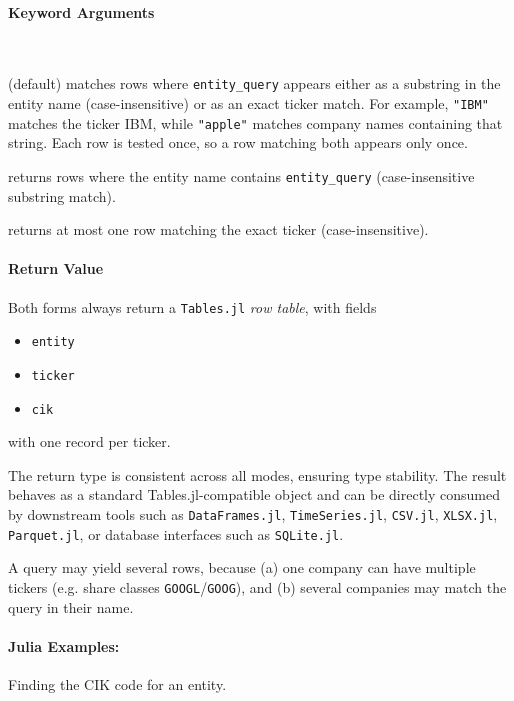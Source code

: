 \documentclass[11pt,a4paper]{report}
\begin{document}
\paragraph{Keyword Arguments}
\begin{description}[nosep]

  \item[\quad - \texttt{by}]~
  \begin{description}[nosep]
    \item[\quad \texttt{:any}] (default) matches rows where \texttt{entity\_query} appears either as a substring in the entity name (case-insensitive) or as an exact ticker match. For example, \texttt{"IBM"} matches the ticker IBM, while \texttt{"apple"} matches company names containing that string. Each row is tested once, so a row matching both appears only once.
    \item[\quad \texttt{:name}] returns rows where the entity name contains \texttt{entity\_query} (case-insensitive substring match).
    \item[\quad \texttt{:ticker}] returns at most one row matching the exact ticker (case-insensitive).
  \end{description}
\end{description}

\paragraph{Return Value} Both forms always return a \texttt{Tables.jl} \emph{row table}, with fields 
\begin{itemize}
  \item \texttt{entity}
  \item \texttt{ticker}
  \item \texttt{cik}
\end{itemize}
with one record per ticker.

The return type is consistent across all modes, ensuring type stability. The result behaves as a standard Tables.jl-compatible object and can be directly consumed by downstream tools such as \texttt{DataFrames.jl}, \texttt{TimeSeries.jl}, \texttt{CSV.jl}, \texttt{XLSX.jl}, \texttt{Parquet.jl}, or database interfaces such as \texttt{SQLite.jl}.

A query may yield several rows, because (a) one company can have multiple tickers
(e.g. share classes \texttt{GOOGL}/\texttt{GOOG}), and (b) several companies may match
the query in their name.

\paragraph{Julia Examples:} Finding the CIK code for an entity.
\end{document}
